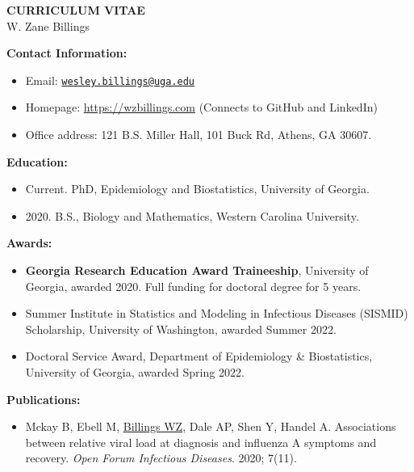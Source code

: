 \documentclass[11pt]{article}
\begin{document}
\begin{center}
\large{
	{\bf CURRICULUM VITAE} \\
	W. Zane Billings \\}
	\hrulefill
\end{center}

\normalsize

{\bf Contact Information:}
\begin{itemize}[noitemsep]
\item Email: \href{mailto:wesley.billings@uga.edu}{\texttt{wesley.billings@uga.edu}}
\item Homepage: \url{https://wzbillings.com} (Connects to GitHub and LinkedIn)
\item Office address: 121 B.S. Miller Hall, 101 Buck Rd, Athens, GA 30607.
\end{itemize}

\vspace{0.2in}
\textbf{Education:}

\begin{itemize}
\item Current. PhD, Epidemiology and Biostatistics, University of Georgia.
\item 2020. B.S., Biology and Mathematics, Western Carolina University.
\end{itemize}

\vspace{0.2in}
\textbf{Awards:}

\begin{itemize}
    \item \textbf{Georgia Research Education Award Traineeship}, University of Georgia, awarded 2020. Full funding for doctoral degree for 5 years.
    \item Summer Institute in Statistics and Modeling in Infectious Diseases (SISMID) Scholarship, University of Washington, awarded Summer 2022.
    \item Doctoral Service Award, Department of Epidemiology \& Biostatistics, University of Georgia, awarded Spring 2022.
\end{itemize}

\vspace{0.2in}
\textbf{Publications:}

\begin{itemize}[noitemsep]
\item Mckay B, Ebell M, \ul{Billings WZ}, Dale AP, Shen Y, Handel A. Associations between relative viral load at diagnosis and influenza A symptoms and recovery. \textit{Open Forum Infectious Diseases}. 2020; 7(11).
\end{itemize}
\end{document}
